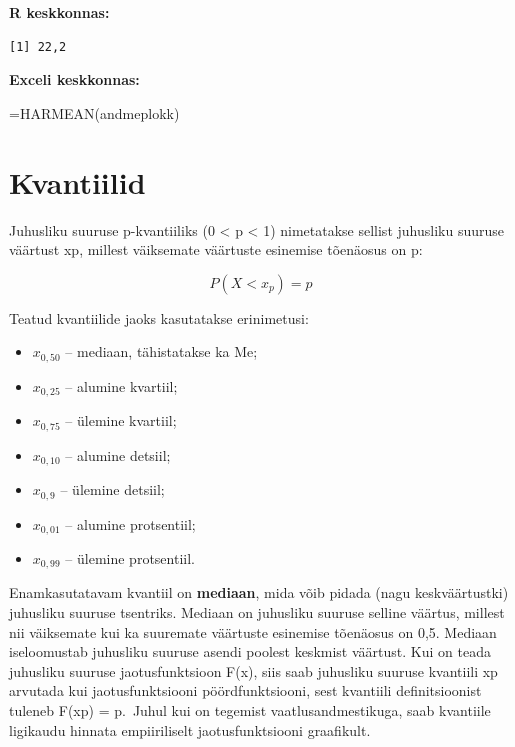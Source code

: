 \documentclass[
]{book}
\newenvironment{Shaded}{\begin{snugshade}}{\end{snugshade}}
\newcommand{\CommentTok}[1]{\textcolor[rgb]{0.56,0.35,0.01}{\textit{#1}}}
\newcommand{\DecValTok}[1]{\textcolor[rgb]{0.00,0.00,0.81}{#1}}
\newcommand{\FunctionTok}[1]{\textcolor[rgb]{0.13,0.29,0.53}{\textbf{#1}}}
\newcommand{\NormalTok}[1]{#1}
\newcommand{\SpecialCharTok}[1]{\textcolor[rgb]{0.81,0.36,0.00}{\textbf{#1}}}
\providecommand{\tightlist}{%
  \setlength{\itemsep}{0pt}\setlength{\parskip}{0pt}}
\renewenvironment{Shaded} {\begin{snugshade}\footnotesize} {\end{snugshade}}
\begin{document}
\textbf{R keskkonnas:}

\begin{Shaded}
\end{Shaded}

\begin{verbatim}
[1] 22,2
\end{verbatim}

\textbf{Exceli keskkonnas:}

\begin{Shaded}
\begin{Highlighting}[]
\NormalTok{=HARMEAN(andmeplokk)}
\end{Highlighting}
\end{Shaded}

\section{Kvantiilid}\label{kvantiilid}

Juhusliku suuruse p-kvantiiliks (0 \textless{} p \textless{} 1) nimetatakse sellist juhusliku suuruse väärtust xp, millest väiksemate väärtuste esinemise tõenäosus on p:

\[ P (X < x_p) = p \]

Teatud kvantiilide jaoks kasutatakse erinimetusi:

\begin{itemize}
\tightlist
\item
  \(x_{0,50}\) -- mediaan, tähistatakse ka Me;
\item
  \(x_{0,25}\) -- alumine kvartiil;
\item
  \(x_{0,75}\) -- ülemine kvartiil;
\item
  \(x_{0,10}\) -- alumine detsiil;
\item
  \(x_{0,9}\) -- ülemine detsiil;
\item
  \(x_{0,01}\) -- alumine protsentiil;
\item
  \(x_{0,99}\) -- ülemine protsentiil.
\end{itemize}

Enamkasutatavam kvantiil on \textbf{mediaan}, mida võib pidada (nagu keskväärtustki) juhusliku suuruse tsentriks. Mediaan on juhusliku suuruse selline väärtus, millest nii väiksemate kui ka suuremate väärtuste esinemise tõenäosus on 0,5. Mediaan iseloomustab juhusliku suuruse asendi poolest keskmist väärtust.
Kui on teada juhusliku suuruse jaotusfunktsioon F(x), siis saab juhusliku suuruse kvantiili xp arvutada kui jaotusfunktsiooni pöördfunktsiooni, sest kvantiili definitsioonist tuleneb F(xp) = p.~Juhul kui on tegemist vaatlusandmestikuga, saab kvantiile ligikaudu hinnata empiiriliselt jaotusfunktsiooni graafikult.
\end{document}

